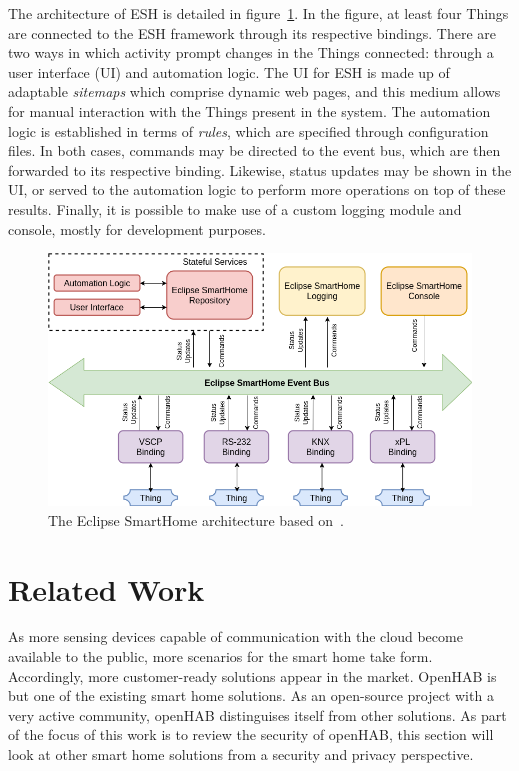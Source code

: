 \documentclass[12pt]{article}
\begin{document}
The architecture of ESH is detailed in figure~\ref{fig:esh_architecture}. In the figure, at least four Things are connected to the ESH framework through its respective bindings. There are two ways in which activity prompt changes in the Things connected: through a user interface (UI) and automation logic. The UI for ESH is made up of adaptable \emph{sitemaps} which comprise dynamic web pages, and this medium allows for manual interaction with the Things present in the system. The automation logic is established in terms of \emph{rules}, which are specified through configuration files. In both cases, commands may be directed to the event bus, which are then forwarded to its respective binding. Likewise, status updates may be shown in the UI, or served to the automation logic to perform more operations on top of these results. Finally, it is possible to make use of a custom logging module and console, mostly for development purposes.

\begin{figure} [ht] 
\begin{center}
\includegraphics[width=\textwidth]{esh_architecture}
\caption{The Eclipse SmartHome architecture based on~\cite{esh_02}.}
\label{fig:esh_architecture}
\end{center}
\end{figure}

\clearpage
\section{Related Work}
\label{sec:related}
As more sensing devices capable of communication with the cloud become available to the public, more scenarios for the smart home take form. Accordingly, more customer-ready solutions appear in the market. OpenHAB is but one of the existing smart home solutions. As an open-source project with a very active community, openHAB distinguises itself from other solutions. As part of the focus of this work is to review the security of openHAB, this section will look at other smart home solutions from a security and privacy perspective. 
\end{document}
